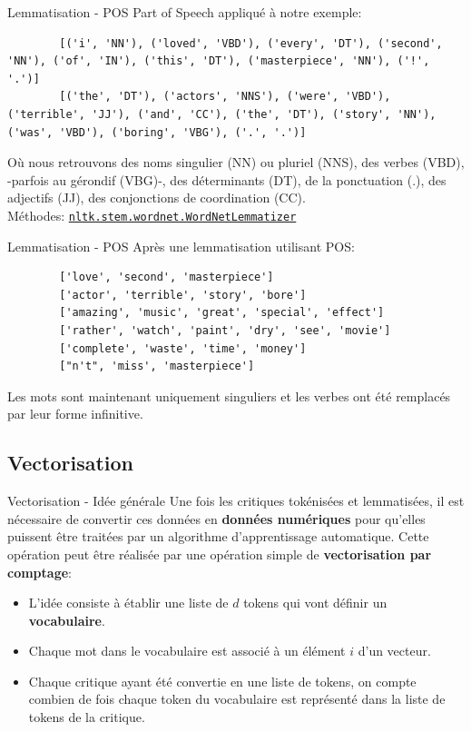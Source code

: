 \begin{frame}[fragile]{Lemmatisation - POS}
	Part of Speech appliqué à notre exemple:
	\begin{lstlisting}
		[('i', 'NN'), ('loved', 'VBD'), ('every', 'DT'), ('second', 'NN'), ('of', 'IN'), ('this', 'DT'), ('masterpiece', 'NN'), ('!', '.')]
		[('the', 'DT'), ('actors', 'NNS'), ('were', 'VBD'), ('terrible', 'JJ'), ('and', 'CC'), ('the', 'DT'), ('story', 'NN'), ('was', 'VBD'), ('boring', 'VBG'), ('.', '.')]
	\end{lstlisting}
	Où nous retrouvons des noms singulier (NN) ou pluriel (NNS), des verbes (VBD), -parfois au gérondif (VBG)-, des déterminants (DT), de la ponctuation (.), des adjectifs (JJ), des conjonctions de coordination (CC). \\
	\vfill
	Méthodes: \href{https://www.nltk.org/api/nltk.stem.wordnet.html#nltk.stem.wordnet.WordNetLemmatizer}{\texttt{nltk.stem.wordnet.WordNetLemmatizer}}
\end{frame}

\begin{frame}[fragile]{Lemmatisation - POS}
	Après une lemmatisation utilisant POS:
	\begin{lstlisting}
		['love', 'second', 'masterpiece']
		['actor', 'terrible', 'story', 'bore']
		['amazing', 'music', 'great', 'special', 'effect']
		['rather', 'watch', 'paint', 'dry', 'see', 'movie']
		['complete', 'waste', 'time', 'money']
		["n't", 'miss', 'masterpiece']
	\end{lstlisting}
	Les mots sont maintenant uniquement singuliers et les verbes ont été remplacés par leur forme infinitive.
\end{frame}

\subsection[Vectorisation]{Vectorisation}

\begin{frame}{Vectorisation - Idée générale}
	Une fois les critiques tokénisées et lemmatisées, il est nécessaire de convertir ces données en \textbf{données numériques} pour qu'elles puissent être traitées par un algorithme d'apprentissage automatique. Cette opération peut être réalisée par une opération simple de \textbf{vectorisation par comptage}:
	\begin{itemize}
		\item L'idée consiste à établir une liste de $d$ tokens qui vont définir un \textbf{vocabulaire}.
		\item Chaque mot dans le vocabulaire est associé à un élément $i$ d'un vecteur.
		\item Chaque critique ayant été convertie en une liste de tokens, on compte combien de fois chaque token du vocabulaire est représenté dans la liste de tokens de la critique.
	\end{itemize}	
\end{frame}

